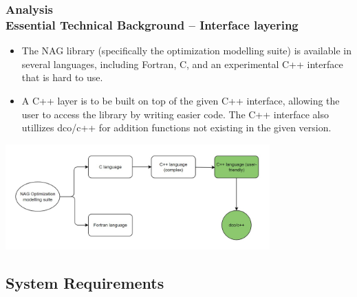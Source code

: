 \documentclass[ucs,10pt]{beamer}
\begin{document}
\begin{frame}
\frametitle{Analysis \\
\small \color{rwth-blue} Essential Technical Background -- Interface layering}
\begin{itemize}
	\item The NAG library (specifically the optimization modelling suite) is available in several languages, including Fortran, C, and an experimental C++ interface that is hard to use.
	\item A C++ layer is to be built on top of the given C++ interface, allowing the user to access the library by writing easier code. The C++ interface also utillizes dco/c++ for addition functions not existing in the given version.
\end{itemize}
\centering\includegraphics[width=4in]{layering.jpeg}
\end{frame}

\subsection{System Requirements}
\end{document}
